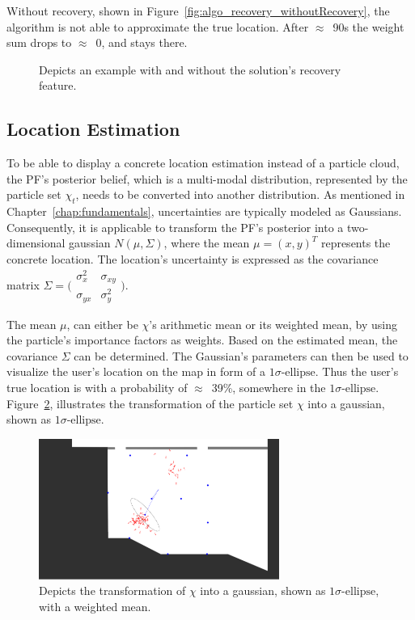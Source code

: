 Without recovery, shown in Figure~\ref{fig:algo_recovery_withoutRecovery}, the algorithm is not able to approximate the true location. After $\approx$~90s the weight sum drops to $\approx$~0, and stays there.




\begin{figure}
	
	\caption {Depicts an example with and without the solution's recovery feature.}
	\label{fig:algo_recovery}
\end{figure}

\subsection{Location Estimation}\label{sec:algo_locEstimation}
To be able to display a concrete location estimation instead of a particle cloud, the \acs{PF}'s posterior belief, which is a multi-modal distribution, represented by the particle set $\chi_t$, needs to be converted into another distribution. As mentioned in Chapter~\ref{chap:fundamentals}, uncertainties are typically modeled as Gaussians. Consequently, it is applicable to transform the \acs{PF}'s posterior into a two-dimensional gaussian $N(\mu, \Sigma)$, where the mean $\mu = (x, y)^T$ represents the concrete location. The location's uncertainty is expressed as the covariance matrix $\Sigma = \bigl(\begin{smallmatrix} \sigma_{x}^2&\sigma_{xy}\\ \sigma_{yx}&\sigma_{y}^2 \end{smallmatrix} \bigr)$.

The mean $\mu$, can either be $\chi$'s arithmetic mean or its weighted mean, by using the particle's importance factors as weights. Based on the estimated mean, the covariance $\Sigma$ can be determined. The Gaussian's parameters can then be used to visualize the user's location on the map in form of a $1\sigma\text{-ellipse}$. Thus the user's true location is with a probability of $\approx$~39\%, somewhere in the $1\sigma\text{-ellipse}$. Figure~\ref{fig:algo_sigellipse}, illustrates the transformation of the particle set $\chi$ into a gaussian, shown as $1\sigma\text{-ellipse}$.

\begin{figure}
	\includegraphics[width=0.7\textwidth]{figures/sigellipse}
	\caption{Depicts the transformation of $\chi$ into a gaussian, shown as $1\sigma\text{-ellipse}$, with a weighted mean.}
	\label{fig:algo_sigellipse}
\end{figure}
